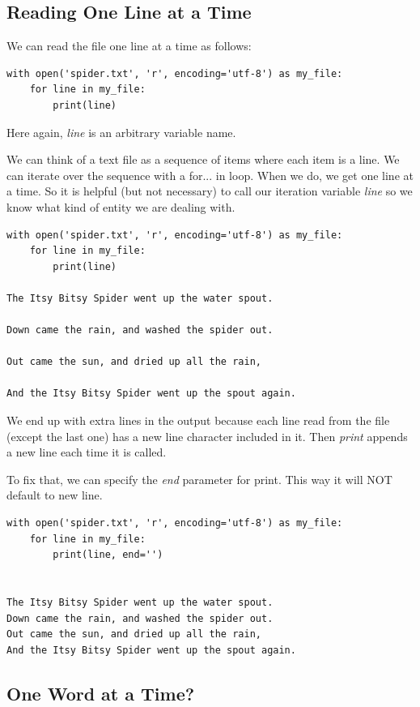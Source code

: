 \documentclass{article}
\begin{document}
\subsection{Reading One Line at a Time}

We can read the file one line at a time as follows:

\begin{lstlisting}
with open('spider.txt', 'r', encoding='utf-8') as my_file:
    for line in my_file:
        print(line)
\end{lstlisting}

Here again, \textit{line} is an arbitrary variable name.

We can think of a text file as a sequence of items where each item is a line.  We can iterate over the sequence with a for... in loop.  When we do, we get one line at a time.  So it is helpful (but not necessary) to call our iteration variable \textit{line} so we know what kind of entity we are dealing with.

\begin{lstlisting}
with open('spider.txt', 'r', encoding='utf-8') as my_file:
    for line in my_file:
        print(line)
 
The Itsy Bitsy Spider went up the water spout.
 
Down came the rain, and washed the spider out.
 
Out came the sun, and dried up all the rain,
 
And the Itsy Bitsy Spider went up the spout again.
\end{lstlisting}

We end up with extra lines in the output because each line read from the file (except the last one) has a new line character included in it.  Then \textit{print} appends a new line each time it is called.

To fix that, we can specify the \textit{end} parameter for print. This way it will NOT default to new line.

\begin{lstlisting}
with open('spider.txt', 'r', encoding='utf-8') as my_file:
    for line in my_file:
        print(line, end='')


The Itsy Bitsy Spider went up the water spout.
Down came the rain, and washed the spider out.
Out came the sun, and dried up all the rain,
And the Itsy Bitsy Spider went up the spout again.
\end{lstlisting}

\subsection{One Word at a Time?}
\end{document}
